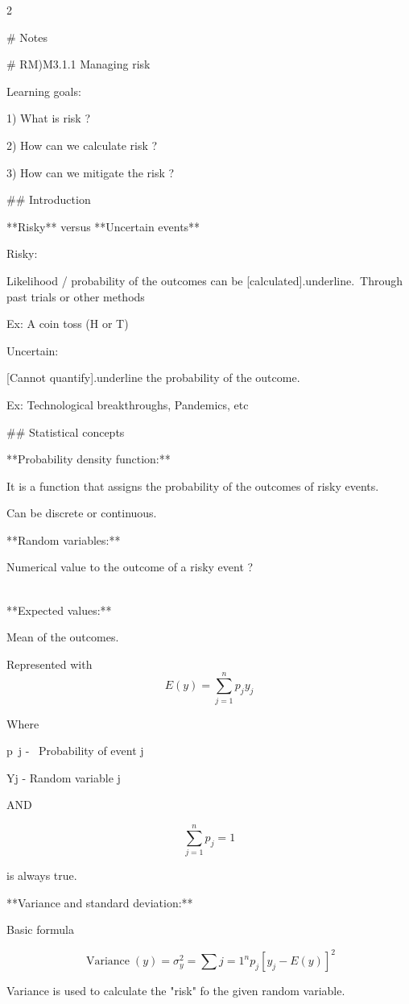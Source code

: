 \documentclass{article}
\begin{document}
\begin{multicols}{2}


    
# Notes

# RM)M3.1.1 Managing risk

Learning goals:

1)  What is risk ?

2)  How can we calculate risk ?

3)  How can we mitigate the risk ?

## Introduction

**Risky** versus **Uncertain events**

Risky:

Likelihood / probability of the outcomes can be [calculated]{.underline}.\
Through past trials or other methods

Ex: A coin toss (H or T)

Uncertain:

[Cannot quantify]{.underline} the probability of the outcome.

Ex: Technological breakthroughs, Pandemics, etc

## Statistical concepts

**Probability density function:**

It is a function that assigns the probability of the outcomes of risky events.

Can be discrete or continuous.

**Random variables:**

Numerical value to the outcome of a risky event ?

\\

**Expected values:**

Mean of the outcomes.

Represented with$$
E(y)=\sum_{j=1}^n p_j y_j 
$$

Where

\space p~j -~ Probability of event j

\space Yj - Random variable j

AND

$$
\sum_{j=1}^n p_j = 1$$

is always true.

**Variance and standard deviation:**

Basic formula

$$
\operatorname{Variance}(y)=\sigma_y^2=\sum{j=1}^n p_j\left[y_j-E(y)\right]^2
$$

Variance is used to calculate the "risk" fo the given random variable.


\end{multicols}
\end{document}
